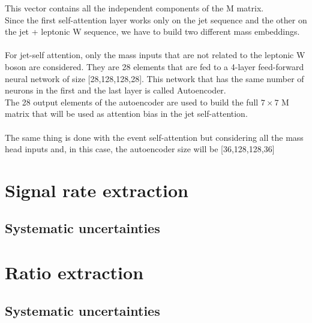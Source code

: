 This vector contains all the independent components of the M matrix.\\
Since the first self-attention layer works only on the jet sequence and the other on the jet + leptonic W sequence, we have to build two different mass embeddings.\\
\\
For jet-self attention, only the mass inputs that are not related to the leptonic W boson are considered. They are 28 elements that are fed to a 4-layer feed-forward neural network of size [28,128,128,28]. This network that has the same number of neurons in the first and the last layer is called Autoencoder.\\
The 28 output elements of the autoencoder are used to build the full $7\times 7$ M matrix that will be used as attention bias in the jet self-attention.\\
\\
The same thing is done with the event self-attention but considering all the mass head inputs and, in this case, the autoencoder size will be [36,128,128,36]








\section{Signal rate extraction}
\subsection{Systematic uncertainties}
\section{Ratio extraction}
\subsection{Systematic uncertainties}